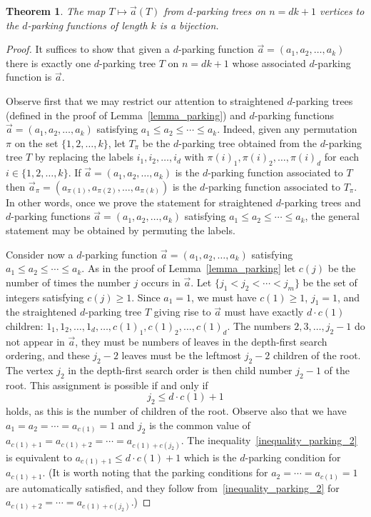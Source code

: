 \documentclass[11pt]{amsart}
\newtheorem{theorem}{Theorem}[section]
\numberwithin{equation}{section}
\begin{document}
\begin{theorem}
The map $T \longmapsto \vec{a}(T)$ from $d$-parking trees on $n = dk+1$ vertices
to the $d$-parking functions of length $k$ is a bijection.
\label{theorem_parking_function_parking_tree}
\end{theorem}
\begin{proof}
It suffices to show that given a $d$-parking function $\vec{a} =
(a_{1},a_{2}, \ldots, a_{k})$ there is exactly one $d$-parking tree $T$
on $n=dk+1$ whose associated $d$-parking function is $\vec{a}$.

Observe first that we may restrict our attention to straightened
$d$-parking trees (defined in the proof of Lemma~\ref{lemma_parking})
and $d$-parking functions $\vec{a} = (a_{1},a_{2}, \ldots, a_{k})$
satisfying $a_{1} \leq a_{2} \leq \cdots \leq a_{k}$. Indeed, given any
permutation $\pi$ on the set $\{1,2,\ldots,k\}$, let $T_{\pi}$ be the
$d$-parking tree obtained from the $d$-parking tree $T$ by  replacing the labels
$i_{1},i_{2},\ldots, i_{d}$ with $\pi(i)_{1},\pi(i)_{2},\ldots,\pi(i)_{d}$ for each
$i\in \{1,2,\ldots,k\}$. If $\vec{a} = (a_{1},a_{2}, \ldots, a_{k})$ is
the $d$-parking function associated to $T$ then
$\vec{a}_{\pi} = (a_{\pi(1)},a_{\pi(2)}, \ldots, a_{\pi(k)})$ is the
$d$-parking function associated to $T_{\pi}$. In other words, once we
prove the statement for straightened $d$-parking trees and $d$-parking
functions $\vec{a} = (a_{1},a_{2}, \ldots, a_{k})$ satisfying $a_{1}\leq
a_{2}\leq \cdots \leq a_{k}$, the general statement may be obtained by
permuting the labels.

Consider now a $d$-parking function $\vec{a} = (a_{1},a_{2}, \ldots, a_{k})$
satisfying $a_{1} \leq a_{2} \leq \cdots \leq a_{k}$.
As in the proof of Lemma~\ref{lemma_parking} let $c(j)$ be the number of
times the number $j$ occurs in $\vec{a}$. Let
$\{j_{1}<j_{2}<\cdots<j_{m}\}$ be the set of integers satisfying $c(j) \geq 1$.
Since $a_{1}=1$, we must have $c(1)\geq 1$, $j_{1}=1$, and the
straightened $d$-parking tree $T$ giving rise to 
$\vec{a}$ must have exactly $d \cdot c(1)$ children: $1_{1},1_{2},\ldots, 1_{d},
\ldots, c(1)_{1}, c(1)_{2}, \ldots, c(1)_{d}$. The numbers $2,3,\ldots,j_{2}-1$
do not appear in $\vec{a}$, they must be numbers of leaves in the
depth-first search ordering, and these $j_{2}-2$ leaves must be the
leftmost $j_{2}-2$ children of the root. The vertex $j_{2}$ in the
depth-first search order is then child number $j_{2}-1$ of the root. This
assignment is possible if and only if
\begin{equation}
\label{inequality_parking_2}  
  j_{2} \leq d \cdot c(1) + 1
\end{equation}  
holds, as this is the number of children of the root. Observe also that we have
$a_{1}=a_{2}=\cdots=a_{c(1)}=1$ and $j_{2}$ is the common value of
$a_{c(1)+1}=a_{c(1)+2}=\cdots=a_{c(1)+c(j_{2})}$. The
inequality~\eqref{inequality_parking_2} is equivalent to
$a_{c(1)+1} \leq d \cdot c(1) + 1$ which is the $d$-parking condition for
$a_{c(1)+1}$. (It is worth noting that the parking conditions for
$a_{2}=\cdots=a_{c(1)}=1$  are automatically satisfied, and they follow
from~\eqref{inequality_parking_2} for
$a_{c(1)+2}=\cdots=a_{c(1)+c(j_{2})}$.)


\end{proof}
\end{document}
